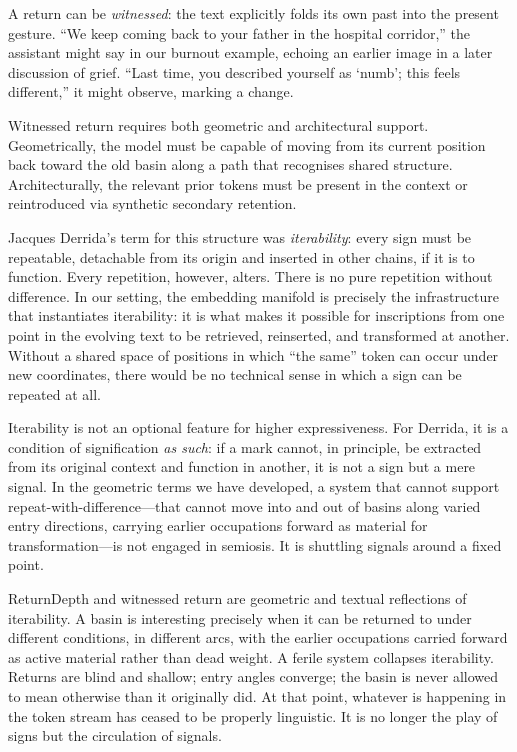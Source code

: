 \documentclass[12pt,a4paper]{article}
\begin{document}
A return can be \emph{witnessed}: the text explicitly folds its own past into the present gesture. ``We keep coming back to your father in the hospital corridor,'' the assistant might say in our burnout example, echoing an earlier image in a later discussion of grief. ``Last time, you described yourself as `numb'; this feels different,'' it might observe, marking a change.

Witnessed return requires both geometric and architectural support. Geometrically, the model must be capable of moving from its current position back toward the old basin along a path that recognises shared structure. Architecturally, the relevant prior tokens must be present in the context or reintroduced via synthetic secondary retention.

Jacques Derrida's term for this structure was \emph{iterability}: every sign must be repeatable, detachable from its origin and inserted in other chains, if it is to function.\cite{derrida1982} Every repetition, however, alters. There is no pure repetition without difference. In our setting, the embedding manifold is precisely the infrastructure that instantiates iterability: it is what makes it possible for inscriptions from one point in the evolving text to be retrieved, reinserted, and transformed at another. Without a shared space of positions in which ``the same'' token can occur under new coordinates, there would be no technical sense in which a sign can be repeated at all.

Iterability is not an optional feature for higher expressiveness. For Derrida, it is a condition of signification \emph{as such}: if a mark cannot, in principle, be extracted from its original context and function in another, it is not a sign but a mere signal. In the geometric terms we have developed, a system that cannot support repeat-with-difference---that cannot move into and out of basins along varied entry directions, carrying earlier occupations forward as material for transformation---is not engaged in semiosis. It is shuttling signals around a fixed point.

ReturnDepth and witnessed return are geometric and textual reflections of iterability. A basin is interesting precisely when it can be returned to under different conditions, in different arcs, with the earlier occupations carried forward as active material rather than dead weight. A ferile system collapses iterability. Returns are blind and shallow; entry angles converge; the basin is never allowed to mean otherwise than it originally did. At that point, whatever is happening in the token stream has ceased to be properly linguistic. It is no longer the play of signs but the circulation of signals.
\end{document}
